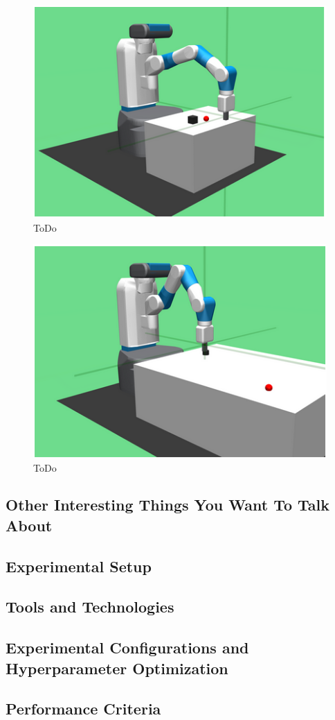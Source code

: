 \begin{figure}[h!]
    \centering
    \includegraphics{images/FP.png}
    \caption{ToDo}
    \label{fig:HER}
\end{figure}

\begin{figure}[h!]
    \centering
    \includegraphics{images/FS.png}
    \caption{ToDo}
    \label{fig:HER}
\end{figure}

\subsection{Other Interesting Things You Want To Talk About}

\subsection{Experimental Setup}

\subsection{Tools and Technologies}

\subsection{Experimental Configurations and Hyperparameter Optimization}

\subsection{Performance Criteria}

